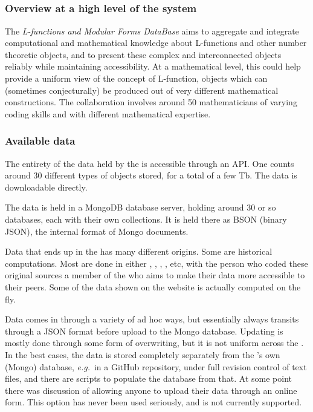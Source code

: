 \subsection{\LMFDB}

\subsubsection{Overview at a high level of the \LMFDB system}

 The \emph{L-functions and Modular Forms DataBase} \cite{lmfdb} aims to aggregate and integrate computational and mathematical knowledge about L-functions and other number theoretic objects, and to present these complex and interconnected objects reliably while maintaining accessibility. At a mathematical level, this could help provide a uniform view of the concept of L-function, objects which can (sometimes conjecturally) be produced out of very different mathematical constructions. The collaboration involves around 50 mathematicians of varying coding skills and with different mathematical expertise.

\subsubsection{Available data}
The entirety of the data held by the \LMFDB is accessible through an API. One counts around 30 different types of objects stored, for a total of a few Tb. The data is downloadable directly.

The data is held in a MongoDB database server, holding around 30 or so databases, each with their own collections. It is held there as BSON (binary JSON), the internal format of Mongo documents.

Data that ends up in the \LMFDB has many different origins. Some are historical computations. Most are done in either \GAP, \Pari, \SageMath, \Magma, etc, with the person who coded these original sources a member of the \LMFDB who aims to make their data more accessible to their peers. Some of the data shown on the website is actually computed on the fly.

Data comes in through a variety of ad hoc ways, but essentially always transits through a JSON format before upload to the Mongo database. Updating is mostly done through some form of overwriting, but it is not uniform across the \LMFDB. In the best cases, the data is stored completely separately from the \LMFDB's own (Mongo) database, \emph{e.g.}~in a GitHub repository, under full revision control of text files, and there are scripts to populate the database from that.
 At some point there was discussion of allowing anyone to upload their data through an online form. This option has never been used seriously, and is not currently supported.


